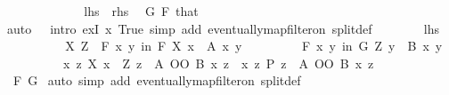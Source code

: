 \begin{isabellebody}
\ \ \ \ \isamarkupfalse%
\isanewline
\ \ \ \ \ \ \isamarkupfalse%
\ {\isacharquery}{\kern0pt}lhs\ \ {\isacharquery}{\kern0pt}rhs\ \isamarkupfalse%
\ G\ F\ that\isanewline
\ \ \ \ \ \ \ \ \isamarkupfalse%
{\isacharparenleft}{\kern0pt}auto\ {}\ {}\ intro{\isacharcolon}{\kern0pt}\ exI{\isacharbrackleft}{\kern0pt}\ x{\isacharequal}{\kern0pt}{\isachardoublequoteopen}{\isasymlambda}{\isacharunderscore}{\kern0pt}{\isachardot}{\kern0pt}\ True{\isachardoublequoteclose}{\isacharbrackright}{\kern0pt}\ simp\ add{\isacharcolon}{\kern0pt}\ eventually{\isacharunderscore}{\kern0pt}map{\isacharunderscore}{\kern0pt}filter{\isacharunderscore}{\kern0pt}on\ split{\isacharunderscore}{\kern0pt}def{\isacharparenright}{\kern0pt}\isanewline
\ \ \ \ \ \ \isamarkupfalse%
\ {\isacharquery}{\kern0pt}lhs\isanewline
\ \ \ \ \ \ \isamarkupfalse%
\ \isamarkupfalse%
\ X\ Z\ \ {\isachardoublequoteopen}{\isasymforall}\isactrlsub F\ {\isacharparenleft}{\kern0pt}x{\isacharcomma}{\kern0pt}\ y{\isacharparenright}{\kern0pt}\ in\ F{\isachardot}{\kern0pt}\ X\ x\ {\isasymand}\ A\ x\ y{\isachardoublequoteclose}\isanewline
\ \ \ \ \ \ \ \ \ {\isachardoublequoteopen}{\isasymforall}\isactrlsub F\ {\isacharparenleft}{\kern0pt}x{\isacharcomma}{\kern0pt}\ y{\isacharparenright}{\kern0pt}\ in\ G{\isachardot}{\kern0pt}\ Z\ y\ {\isasymand}\ B\ x\ y{\isachardoublequoteclose}\isanewline
\ \ \ \ \ \ \ \ \ {\isachardoublequoteopen}{\isacharparenleft}{\kern0pt}{\isasymlambda}{\isacharparenleft}{\kern0pt}x{\isacharcomma}{\kern0pt}\ z{\isacharparenright}{\kern0pt}{\isachardot}{\kern0pt}\ X\ x\ {\isasymand}\ Z\ z\ {\isasymand}\ {\isacharparenleft}{\kern0pt}A\ OO\ B{\isacharparenright}{\kern0pt}\ x\ z{\isacharparenright}{\kern0pt}\ {\isasymle}\ {\isacharparenleft}{\kern0pt}{\isasymlambda}{\isacharparenleft}{\kern0pt}x{\isacharcomma}{\kern0pt}\ z{\isacharparenright}{\kern0pt}{\isachardot}{\kern0pt}\ P\ z\ {\isasymand}\ {\isacharparenleft}{\kern0pt}A\ OO\ B{\isacharparenright}{\kern0pt}\ x\ z{\isacharparenright}{\kern0pt}{\isachardoublequoteclose}\isanewline
\ \ \ \ \ \ \ \ \isamarkupfalse%
\ F\ G\ \isamarkupfalse%
{\isacharparenleft}{\kern0pt}auto\ simp\ add{\isacharcolon}{\kern0pt}\ eventually{\isacharunderscore}{\kern0pt}map{\isacharunderscore}{\kern0pt}filter{\isacharunderscore}{\kern0pt}on\ split{\isacharunderscore}{\kern0pt}def{\isacharparenright}{\kern0pt}\isanewline

\end{isabellebody}
